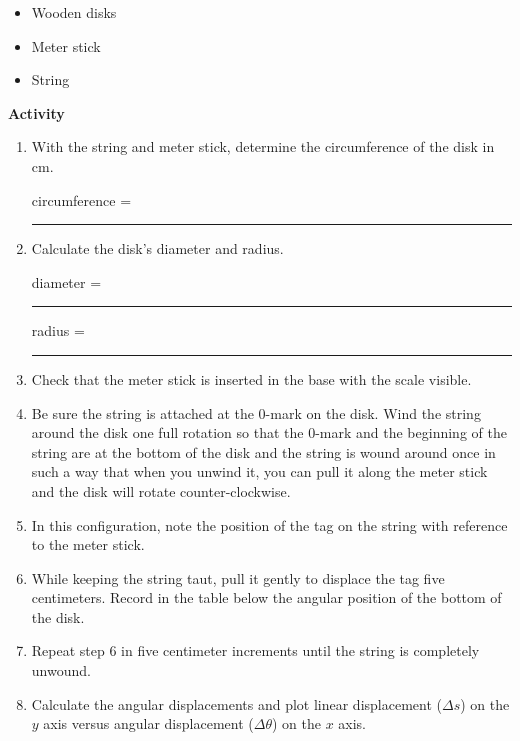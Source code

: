 \begin{itemize}
\item Wooden disks
\item Meter stick
\item String
\end{itemize}
{\noindent \bf Activity} \begin{enumerate}

\item With the string and meter stick, determine the circumference of the disk in cm.

\bigskip

\begin{center} circumference = \rule{3cm}{0.4pt} \end{center}

\item Calculate the disk's diameter and radius.

\bigskip

\begin{center} diameter = \rule{3cm}{0.4pt} \hspace{1cm} radius = \rule{3cm}{0.4pt} \end{center}

\item Check that the meter stick is inserted in the base with the scale visible.

\item Be sure the string is attached at the 0-mark on the disk. Wind the string around the disk one full rotation so that the 0-mark and the beginning of the string are at the bottom of the disk and the string is wound around once in such a way that when you unwind it, you can pull it along the meter stick and the disk will rotate counter-clockwise.

\item In this configuration, note the position of the tag on the string with reference to the meter stick.

\item While keeping the string taut, pull it gently to displace the tag five centimeters. Record in the table below the angular position of the bottom of the disk.

\item Repeat step 6 in five centimeter increments until the string is completely unwound.

\pagebreak

\item Calculate the angular displacements and plot linear displacement 
($\Delta s$) on the $y$ axis versus angular displacement ($\Delta\theta$) on the 
$x$ axis.

\end{enumerate}

